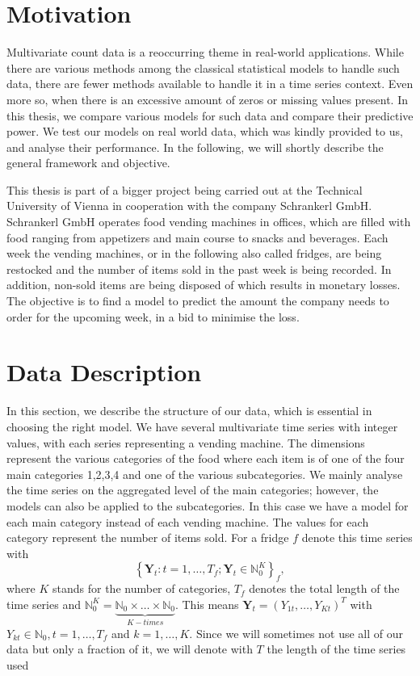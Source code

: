 \section{Motivation}
\label{sec:Motivation}

Multivariate count data is a reoccurring theme in real-world applications. While there are various methods among the classical statistical models to handle such data, there are fewer methods available to handle it in a time series context. Even more so, when there is an excessive amount of zeros or missing values present. In this thesis, we compare various models for such data and compare their predictive power. We test our models on real world data, which was kindly provided to us, and analyse their performance. In the following, we will shortly describe the general framework and objective. 

This thesis is part of a bigger project being carried out at the Technical University of Vienna in cooperation with the company Schrankerl GmbH. Schrankerl GmbH operates food vending machines in offices, which are filled with food ranging from appetizers and main course to snacks and beverages. Each week the vending machines, or in the following also called fridges, are being restocked and the number of items sold in the past week is being recorded. In addition, non-sold items are being disposed of which results in monetary losses. The objective is to find a model to predict the amount the company needs to order for the upcoming week, in a bid to minimise the loss.

\section{Data Description}
\label{sec: Data Description}

In this section, we describe the structure of our data, which is essential in choosing the right model. We have several multivariate time series with integer values, with each series representing a vending machine. The dimensions represent the various categories of the food where each item is of one of the four main categories 1,2,3,4 and one of the various subcategories. We mainly analyse the time series on the aggregated level of the main categories; however, the models can also be applied to the subcategories. In this case we have a model for each main category instead of each vending machine. The values for each category represent the number of items sold. For a fridge $f$ denote this time series with 
%
\begin{equation}
\left\{\bm{Y}_t:t=1,\ldots,T_f; \bm{Y}_t \in \mathbb{N}_0^K \right\}_f,
\label{eq:time series definition}
\end{equation}
%
where $K$ stands for the number of categories, $T_f$ denotes the total length of the time series and $\mathbb{N}_0^K = \underbrace{\mathbb{N}_0 \times \ldots \times \mathbb{N}_0}_{K-times}$. This means $\bm{Y}_t = (Y_{1t},\ldots,Y_{Kt})^T$ with $Y_{kt} \in \mathbb{N}_0, t=1,\ldots,T_f$ and $k=1,\ldots,K$. Since we will sometimes not use all of our data but only a fraction of it, we will denote with $T$ the length of the time series used

